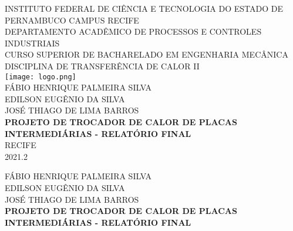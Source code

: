 \documentclass[a4paper,12pt,oneside]{article}
\begin{document}
	
\begin{center}

	\large{
		INSTITUTO FEDERAL DE CIÊNCIA E TECNOLOGIA DO ESTADO DE PERNAMBUCO CAMPUS RECIFE\\ 
		\vspace{0.2cm}
		DEPARTAMENTO ACADÊMICO DE PROCESSOS E CONTROLES INDUSTRIAIS\\
		\vspace{0.2cm} 
		CURSO SUPERIOR DE BACHARELADO EM ENGENHARIA MECÂNICA\\
		\vspace{0.2cm} 
		DISCIPLINA DE TRANSFERÊNCIA DE CALOR II\\ 
		\vspace{1.3cm}
		\texttt{[image: logo.png]}\\
		\vspace{1cm}
		FÁBIO HENRIQUE PALMEIRA SILVA\\
		EDILSON EUGÊNIO DA SILVA\\
		JOSÉ THIAGO DE LIMA BARROS \\
		
		\vspace{1.7cm}
		\textbf{PROJETO DE TROCADOR DE CALOR DE PLACAS INTERMEDIÁRIAS - RELATÓRIO FINAL
		}\\
		\vspace{3.5cm}
		RECIFE\\
		\vspace{0.2cm}
		2021.2	
	}

\end{center}
\thispagestyle{empty}

\pagebreak
\clearpage
\newpage

\begin{center}

\large{
	
	FÁBIO HENRIQUE PALMEIRA SILVA\\
	EDILSON EUGÊNIO DA SILVA\\
	JOSÉ THIAGO DE LIMA BARROS\\

\vspace{5.6cm}	
\textbf{PROJETO DE TROCADOR DE CALOR DE PLACAS INTERMEDIÁRIAS - RELATÓRIO FINAL}}

\end{center}

\vspace{2.5cm}
\end{document}
